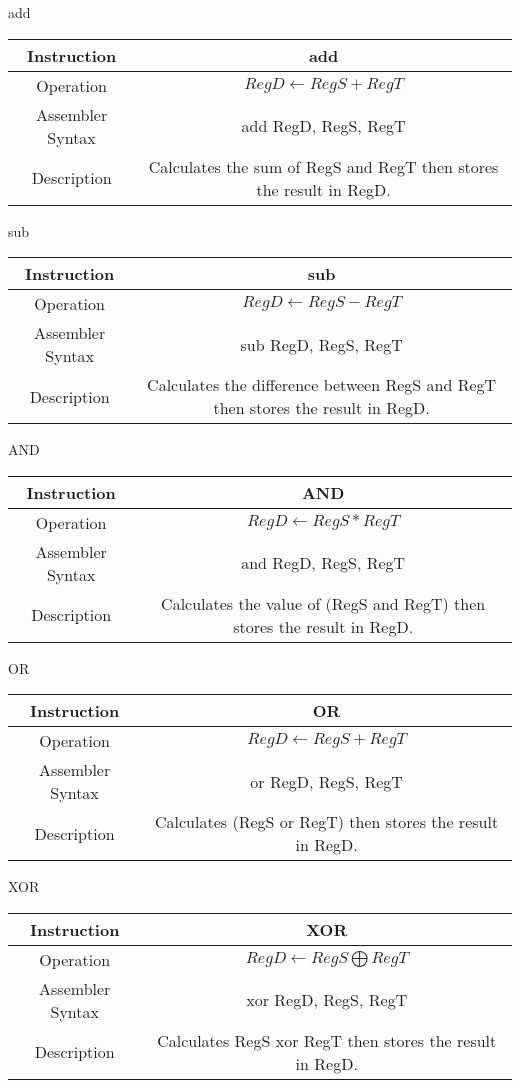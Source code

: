 \documentclass[]{article}
\begin{document}
add\\
\begin{tabular}{c|c}\hline
	Instruction & add\\\hline
	Operation & $RegD \leftarrow RegS + RegT$\\\hline
	Assembler Syntax & add RegD, RegS, RegT\\\hline
	Description & Calculates the sum of RegS and RegT then stores the result in RegD.\\\hline
\end{tabular}
\vspace{1.5cm}

sub\\
\begin{tabular}{c|c}\hline
	Instruction & sub\\\hline
	Operation & $RegD \leftarrow RegS - RegT$\\\hline
	Assembler Syntax & sub RegD, RegS, RegT\\\hline
	Description & Calculates the difference between RegS and RegT then stores the result in RegD.\\\hline
\end{tabular}

AND\\
\begin{tabular}{c|c}\hline
	Instruction & AND\\\hline
	Operation & $RegD \leftarrow RegS*RegT$\\\hline
	Assembler Syntax & and RegD, RegS, RegT\\\hline
	Description & Calculates the value of (RegS and RegT) then stores the result in RegD.\\\hline
\end{tabular}\vspace{1.5cm}

OR\\
\begin{tabular}{c|c}\hline
	Instruction & OR\\\hline
	Operation & $RegD \leftarrow RegS + RegT$\\\hline
	Assembler Syntax & or RegD, RegS, RegT\\\hline
	Description & Calculates (RegS or RegT) then stores the result in RegD.\\\hline
\end{tabular}\vspace{1.5cm}

XOR\\
\begin{tabular}{c|c}\hline
	Instruction & XOR\\\hline
	Operation & $RegD \leftarrow RegS \bigoplus RegT$\\\hline
	Assembler Syntax & xor RegD, RegS, RegT\\\hline
	Description & Calculates RegS xor RegT then stores the result in RegD.\\\hline
\end{tabular}\vspace{1.5cm}
\end{document}
